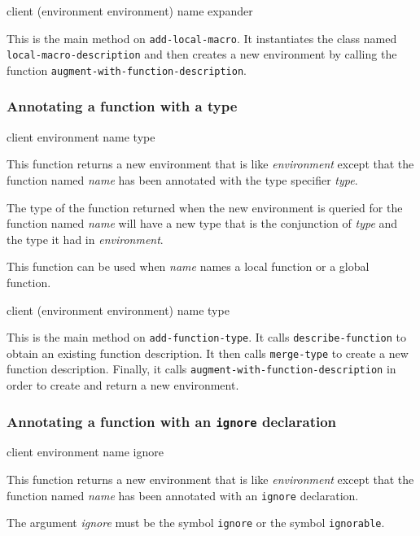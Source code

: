 {\footnotesize
{} {client (environment environment) name expander}
}

This is the main method on \texttt{add-local-macro}.  It instantiates
the class named \texttt{local-macro-description} and then creates a
new environment by calling the function
\texttt{augment-with-function-description}.

\subsubsection{Annotating a function with a type}
\label{sec-annotating-a-function-with-a-type}

{\footnotesize
{} {client environment name type}
}

This function returns a new environment that is like
\textit{environment} except that the function named \textit{name} has
been annotated with the type specifier \textit{type}.

The type of the function returned when the new environment is queried
for the function named \textit{name} will have a new type that is the
conjunction of \textit{type} and the type it had in
\textit{environment}.

This function can be used when \textit{name} names a local function or
a global function.

{\footnotesize
{}
{client
 (environment environment)
 name
 type}
}

This is the main method on \texttt{add-function-type}.  It
calls \texttt{describe-function} to obtain an existing function
description.  It then calls \texttt{merge-type} to create a new
function description.  Finally, it calls
\texttt{augment-with-function-description} in order to create and
return a new environment.

\subsubsection{Annotating a function with an \texttt{ignore} declaration}
\label{sec-annotating-a-function-with-ignore}

{\footnotesize
{} {client environment name ignore}
}

This function returns a new environment that is like
\textit{environment} except that the function named \textit{name} has
been annotated with an \texttt{ignore} declaration.

The argument \textit{ignore} must be the symbol \texttt{ignore} or the
symbol \texttt{ignorable}.

